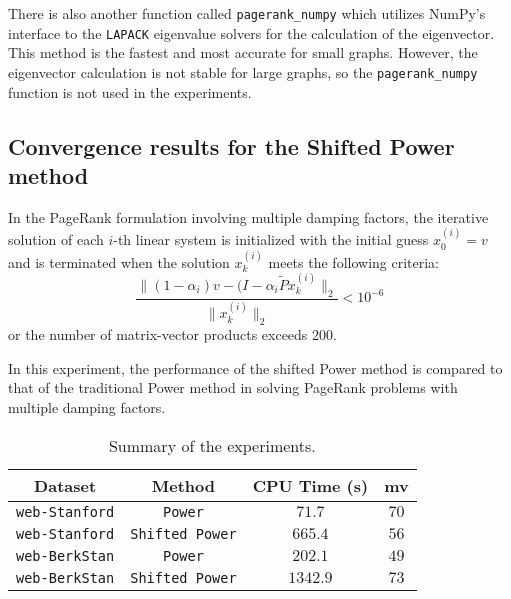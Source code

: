 \noindent There is also another function called \texttt{pagerank\_numpy} which utilizes NumPy's interface to the \texttt{LAPACK} eigenvalue solvers for the calculation of the eigenvector. This method is the fastest and most accurate for small graphs. However, the eigenvector calculation is not stable for large graphs, so the \texttt{pagerank\_numpy} function is not used in the experiments.

\subsection{Convergence results for the Shifted Power method}

In the PageRank formulation involving multiple damping factors, the iterative solution of each $i$-th linear system is initialized with the initial guess $x_0^{(i)} = v$ and is terminated when the solution $x_k^{(i)}$ meets the following criteria:
\begin{equation*}
    \frac{\lVert (1 - \alpha_i)v - (I - \alpha_i \tilde P x_k^{(i)} \rVert_2}{\lVert x_k^{(i)} \rVert_2} < 10^{-6}
\end{equation*}
or the number of matrix-vector products exceeds $200$. \vspace*{0.5cm}

\noindent In this experiment, the performance of the shifted Power method is compared to that of the traditional Power method in solving PageRank problems with multiple damping factors.

\begin{table}[h]
\centering
\begin{tabular}{|c|c|c|c|}
\hline
\textbf{Dataset} & \textbf{Method} & \textbf{CPU Time (s)} & \textbf{mv} \\ \hline
\texttt{web-Stanford} & \texttt{Power} & $71.7$ & $70$  \\ \hline
\texttt{web-Stanford} & \texttt{Shifted Power} & $665.4$ & $56$ \\ \hline

\hline

\texttt{web-BerkStan} & \texttt{Power} & $202.1$ & $49$  \\ \hline
\texttt{web-BerkStan} & \texttt{Shifted Power} & $1342.9$ & $73$ \\ \hline
\end{tabular}
\caption{Summary of the experiments.}
\label{tab:results}
\end{table}

